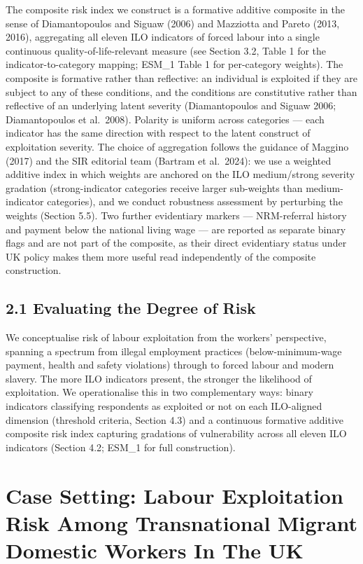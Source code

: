 \documentclass[
  12pt,
  letterpaper,
  DIV=11,
  numbers=noendperiod]{scrartcl}
\begin{document}
The composite risk index we construct is a formative additive composite
in the sense of Diamantopoulos and Siguaw (2006) and Mazziotta and
Pareto (2013, 2016), aggregating all eleven ILO indicators of forced
labour into a single continuous quality-of-life-relevant measure (see
Section 3.2, Table 1 for the indicator-to-category mapping; ESM\_1 Table
1 for per-category weights). The composite is formative rather than
reflective: an individual is exploited if they are subject to any of
these conditions, and the conditions are constitutive rather than
reflective of an underlying latent severity (Diamantopoulos and Siguaw
2006; Diamantopoulos et al.~2008). Polarity is uniform across categories
--- each indicator has the same direction with respect to the latent
construct of exploitation severity. The choice of aggregation follows
the guidance of Maggino (2017) and the SIR editorial team (Bartram et
al.~2024): we use a weighted additive index in which weights are
anchored on the ILO medium/strong severity gradation (strong-indicator
categories receive larger sub-weights than medium-indicator categories),
and we conduct robustness assessment by perturbing the weights (Section
5.5). Two further evidentiary markers --- NRM-referral history and
payment below the national living wage --- are reported as separate
binary flags and are not part of the composite, as their direct
evidentiary status under UK policy makes them more useful read
independently of the composite construction.

\subsection{2.1 Evaluating the Degree of
Risk}\label{evaluating-the-degree-of-risk}

We conceptualise risk of labour exploitation from the workers'
perspective, spanning a spectrum from illegal employment practices
(below-minimum-wage payment, health and safety violations) through to
forced labour and modern slavery. The more ILO indicators present, the
stronger the likelihood of exploitation. We operationalise this in two
complementary ways: binary indicators classifying respondents as
exploited or not on each ILO-aligned dimension (threshold criteria,
Section 4.3) and a continuous formative additive composite risk index
capturing gradations of vulnerability across all eleven ILO indicators
(Section 4.2; ESM\_1 for full construction).

\section{Case Setting: Labour Exploitation Risk Among Transnational
Migrant Domestic Workers In The
UK}\label{case-setting-labour-exploitation-risk-among-transnational-migrant-domestic-workers-in-the-uk}
\end{document}
